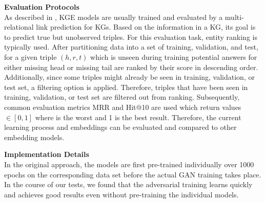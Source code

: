 \textbf{Evaluation Protocols}\\
As described in \cite{Ruffinelli2020You},
\ac{KGE} models are usually trained and evaluated by a multi-relational link prediction for \acp{KG}.
Based on the information in a \ac{KG}, its goal is to predict true but unobserved triples.
For this evaluation task, entity ranking is typically used.
After partitioning data into a set of training, validation, and test, for a given triple $(h,r,t)$ which is unseen during training potential answers for either missing head or missing tail are ranked by their score in descending order.
Additionally, since some triples might already be seen in training, validation, or test set, a filtering option is applied.
Therefore, triples that have been seen in training, validation, or test set are filtered out from ranking.
Subsequently, common evaluation metrics MRR and Hit@10 are used which return values $\in [0,1]$ where is the worst and 1 is the best result.
Therefore, the current learning process and embeddings can be evaluated and compared to other embedding models.

\textbf{Implementation Details}\\
In the original \kbgan approach, the models are first pre-trained individually over 1000 epochs on the corresponding data set before the actual \ac{GAN} training takes place.
In the course of our tests, we found that the adversarial training learns quickly and achieves good results even without pre-training the individual models.

